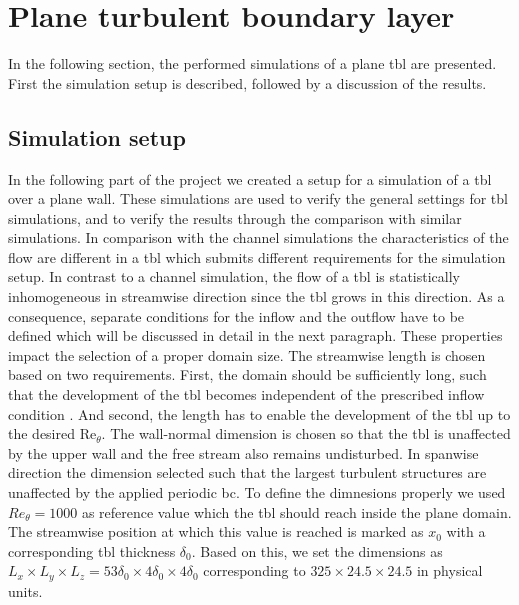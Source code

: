 \section{Plane turbulent boundary layer}\label{sec:planeTBL}

In the following section, the performed simulations of a plane \acrshort{tbl} are presented.
First the simulation setup is described, followed by a discussion of the results.


\subsection{Simulation setup} \label{subsec:planeTBLSetup}

In the following part of the project we created a setup for a simulation of a \acrshort{tbl} over a plane wall.
These simulations are used to verify the general settings for \acrshort{tbl} simulations, and to verify the results through the comparison with similar simulations.
In comparison with the channel simulations the characteristics of the flow are different in a \acrshort{tbl} which submits different requirements for the simulation setup.
In contrast to a channel simulation, the flow of a \acrshort{tbl} is statistically inhomogeneous in streamwise direction since the \acrshort{tbl} grows in this direction.
As a consequence, separate conditions for the inflow and the outflow have to be defined which will be discussed in detail in the next paragraph.
These properties impact the selection of a proper domain size.
The streamwise length is chosen based on two requirements.
First, the domain should be sufficiently long, such that the development of the \acrshort{tbl} becomes independent of the prescribed inflow condition .
And second, the length has to enable the development of the \acrshort{tbl} up to the desired $\mathrm{Re}_{\theta}$.
The wall-normal dimension is chosen so that the \acrshort{tbl} is unaffected by the upper wall and the free stream also remains undisturbed. 
In spanwise direction the dimension selected such that the largest turbulent structures are unaffected by the applied periodic \acrshort{bc}.
To define the dimnesions properly we used $Re_{\theta} = 1000$ as reference value which the \acrshort{tbl} should reach inside the plane domain.
The streamwise position at which this value is reached is marked as $x_0$ with a corresponding \acrshort{tbl} thickness $\delta_0$.
Based on this, we set the dimensions as $L_x \times L_y \times L_z = 53\delta_{0} \times 4\delta_{0} \times 4\delta_{0}$ corresponding to $325 \times 24.5 \times 24.5$ in physical units.
